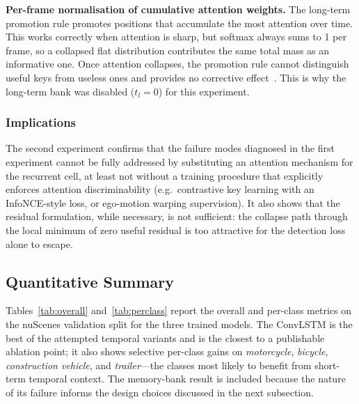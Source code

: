 \documentclass[12pt,a4paper]{report}
\begin{document}
\textbf{Per-frame normalisation of cumulative attention weights.}
The long-term promotion rule promotes positions that accumulate
the most attention over time. This works correctly when attention
is sharp, but softmax always sums to 1 per frame, so a collapsed
flat distribution contributes the same total mass as an
informative one. Once attention collapses, the promotion rule
cannot distinguish useful keys from useless ones and provides no
corrective effect~\cite{Shao2023ReasonNet}. This is why the
long-term bank was disabled ($t_l = 0$) for this experiment.

\subsubsection{Implications}
\quad The second experiment confirms that the failure modes
diagnosed in the first experiment cannot be fully addressed by
substituting an attention mechanism for the recurrent cell, at
least not without a training procedure that explicitly enforces
attention discriminability (e.g.\ contrastive key learning with
an InfoNCE-style loss, or ego-motion warping supervision). It
also shows that the residual formulation, while necessary, is not
sufficient: the collapse path through the local minimum of zero
useful residual is too attractive for the detection loss alone to
escape.

\subsection{Quantitative Summary}
\quad Tables~\ref{tab:overall} and~\ref{tab:perclass} report the
overall and per-class metrics on the nuScenes validation split
for the three trained models. The ConvLSTM is the best of the
attempted temporal variants and is the closest to a publishable
ablation point; it also shows selective per-class gains on
\emph{motorcycle}, \emph{bicycle}, \emph{construction vehicle},
and \emph{trailer}---the classes most likely to benefit from
short-term temporal context.
The memory-bank result is included because the nature of its
failure informs the design choices discussed in the next
subsection.
\end{document}
